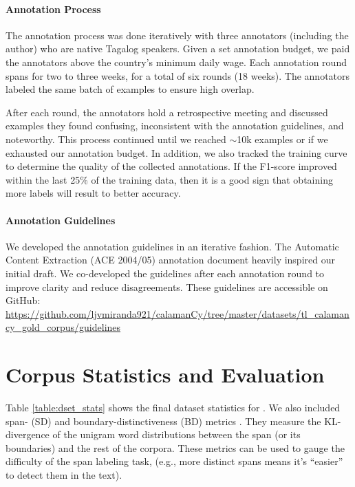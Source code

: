 \documentclass[11pt]{article}
\begin{document}
\paragraph{Annotation Process}
The annotation process was done iteratively with three annotators (including the author) who are native Tagalog speakers.
Given a set annotation budget, we paid the annotators above the country's minimum daily wage.
Each annotation round spans for two to three weeks, for a total of six rounds (18 weeks).
The annotators labeled the same batch of examples to ensure high overlap.

After each round, the annotators hold a retrospective meeting and discussed examples they found confusing, inconsistent with the annotation guidelines, and noteworthy.
This process continued until we reached $\sim$10k examples or if we exhausted our annotation budget.
In addition, we also tracked the training curve to determine the quality of the collected annotations.
If the F1-score improved within the last 25\% of the training data, then it is a good sign that obtaining more labels will result to better accuracy.

\paragraph{Annotation Guidelines}
We developed the annotation guidelines in an iterative fashion.
The Automatic Content Extraction (ACE 2004/05) annotation document \cite{Doddington2004TheAC} heavily inspired our initial draft.
We co-developed the guidelines after each annotation round to improve clarity and reduce disagreements.
These guidelines are accessible on GitHub: \url{https://github.com/ljvmiranda921/calamanCy/tree/master/datasets/tl_calamancy_gold_corpus/guidelines}

\section{Corpus Statistics and Evaluation}

Table \ref{table:dset_stats} shows the final dataset statistics for \tlunified{}.
We also included span- (SD) and boundary-distinctiveness (BD) metrics \cite{Papay2020DissectingSI}.
They measure the KL-divergence of the unigram word distributions between the span (or its boundaries) and the rest of the corpora.
These metrics can be used to gauge the difficulty of the span labeling task, (e.g., more distinct spans means it's ``easier'' to detect them in the text).
\end{document}
